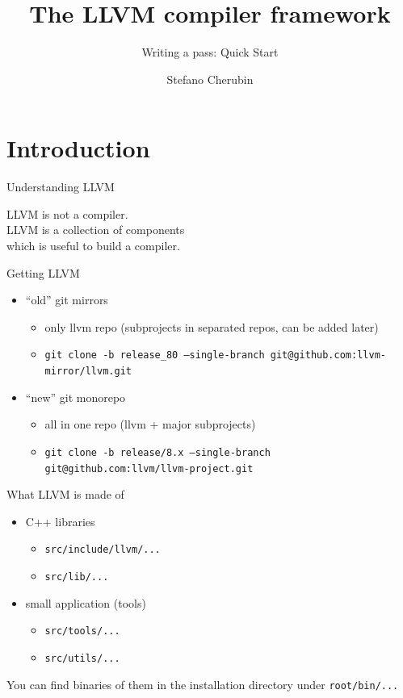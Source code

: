 \documentclass[10pt,mathserif]{beamer}
\author{Stefano Cherubin}
\institute{Politecnico di Milano}
\date{\DATE}
\title{The LLVM compiler framework}
\subtitle{Writing a pass: Quick Start}
\begin{document}
\begin{frame}
\maketitle
\end{frame}

\section{Introduction}
\begin{frame}{Understanding LLVM}
	\begin{center}
	\huge{
		LLVM is not a compiler.\\
		\pause
		\vfill
		LLVM is a collection of components\\
		which is useful to build a compiler.
	}
	\end{center}
\end{frame}

\begin{frame}{Getting LLVM}
\begin{itemize}
	\item ``old'' git mirrors
		\begin{itemize}
			\item only llvm repo (subprojects in separated repos, can be added later)
			\item \texttt{git clone -b release\_80 --single-branch git@github.com:llvm-mirror/llvm.git}
		\end{itemize}
	\vfill
	\item ``new'' git monorepo
		\begin{itemize}
			\item all in one repo (llvm + major subprojects)
			\item \texttt{git clone -b release/8.x --single-branch git@github.com:llvm/llvm-project.git}
		\end{itemize}
\end{itemize}
\end{frame}

\begin{frame}{What LLVM is made of}
\begin{itemize}
	\item C++ libraries
		\begin{itemize}
			\item \texttt{src/include/llvm/...}
			\item \texttt{src/lib/...}
		\end{itemize}
		\vfill
	\item small application (tools)
		\begin{itemize}
			\item \texttt{src/tools/...}
			\item \texttt{src/utils/...}
		\end{itemize}
\end{itemize}
\vfill
You can find binaries of them in the installation directory under \texttt{root/bin/...}
\end{frame}
\end{document}
